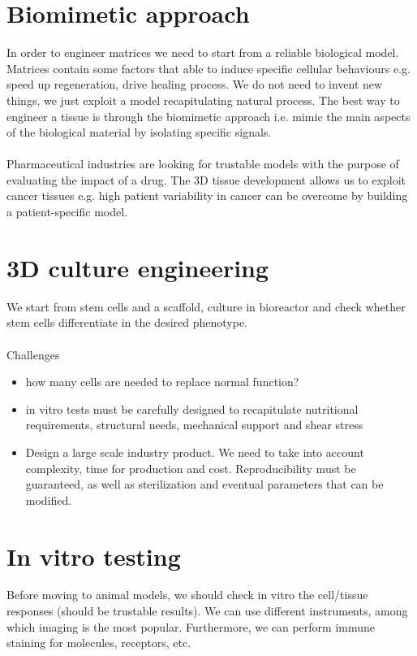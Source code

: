 \section{Biomimetic approach}
In order to engineer matrices we need to start from a reliable biological model. 
Matrices contain some factors that able to induce specific cellular behaviours e.g. speed up regeneration, drive healing process. 
We do not need to invent new things, we just exploit a model recapitulating natural process. 
The best way to engineer a tissue is through the biomimetic approach i.e. mimic the main aspects of the biological material by isolating specific signals. 
\\
\\
\noindent
Pharmaceutical industries are looking for trustable models with the purpose of evaluating the impact of a drug. 
The 3D tissue development allows us to exploit cancer tissues e.g. high patient variability in cancer can be overcome by building a patient-specific model. 

\section{3D culture engineering}
We start from stem cells and a scaffold, culture in bioreactor and check whether stem cells differentiate in the desired phenotype.  
\\
\\
\noindent
Challenges
\begin{itemize}
\item how many cells are needed to replace normal function?
\item in vitro tests must be carefully designed to recapitulate nutritional requirements, structural needs, mechanical support and shear stress
\item Design a large scale industry product. We need to take into account complexity, time for production and cost. Reproducibility must be guaranteed, as well as sterilization and eventual parameters that can be modified.
\end{itemize}

\section{In vitro testing}
Before moving to animal models, we should check in vitro the cell/tissue responses (should be trustable results).
We can use different instruments, among which imaging is the most popular. 
Furthermore, we can perform immune staining for molecules, receptors, etc.

